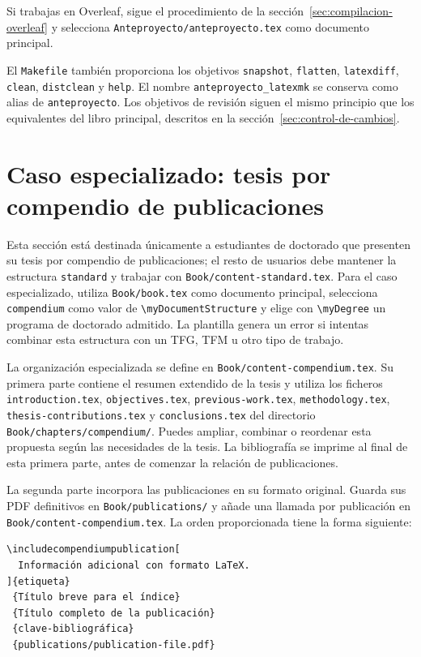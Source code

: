 Si trabajas en Overleaf, sigue el procedimiento de la sección~\ref{sec:compilacion-overleaf} y selecciona \texttt{Anteproyecto/anteproyecto.tex} como documento principal.

El \texttt{Makefile} también proporciona los objetivos \texttt{snapshot}, \texttt{flatten}, \texttt{latexdiff}, \texttt{clean}, \texttt{distclean} y \texttt{help}. El nombre \texttt{anteproyecto\_latexmk} se conserva como alias de \texttt{anteproyecto}. Los objetivos de revisión siguen el mismo principio que los equivalentes del libro principal, descritos en la sección~\ref{sec:control-de-cambios}.

\section{Caso especializado: tesis por compendio de publicaciones}
\label{sec:tesis-compendio}

Esta sección está destinada únicamente a estudiantes de doctorado que presenten su tesis por compendio de publicaciones; el resto de usuarios debe mantener la estructura \texttt{standard} y trabajar con \texttt{Book/content-standard.tex}. Para el caso especializado, utiliza \texttt{Book/book.tex} como documento principal, selecciona \texttt{compendium} como valor de \texttt{\textbackslash{}myDocumentStructure} y elige con \texttt{\textbackslash{}myDegree} un programa de doctorado admitido. La plantilla genera un error si intentas combinar esta estructura con un TFG, TFM u otro tipo de trabajo.

La organización especializada se define en \texttt{Book/content-compendium.tex}. Su primera parte contiene el resumen extendido de la tesis y utiliza los ficheros \texttt{introduction.tex}, \texttt{objectives.tex}, \texttt{previous-work.tex}, \texttt{methodology.tex}, \texttt{thesis-contributions.tex} y \texttt{conclusions.tex} del directorio \texttt{Book/chapters/compendium/}. Puedes ampliar, combinar o reordenar esta propuesta según las necesidades de la tesis. La bibliografía se imprime al final de esta primera parte, antes de comenzar la relación de publicaciones.

La segunda parte incorpora las publicaciones en su formato original. Guarda sus PDF definitivos en \texttt{Book/publications/} y añade una llamada por publicación en \texttt{Book/content-compendium.tex}. La orden proporcionada tiene la forma siguiente:

\begin{verbatim}
\includecompendiumpublication[
  Información adicional con formato LaTeX.
]{etiqueta}
 {Título breve para el índice}
 {Título completo de la publicación}
 {clave-bibliográfica}
 {publications/publication-file.pdf}
\end{verbatim}

